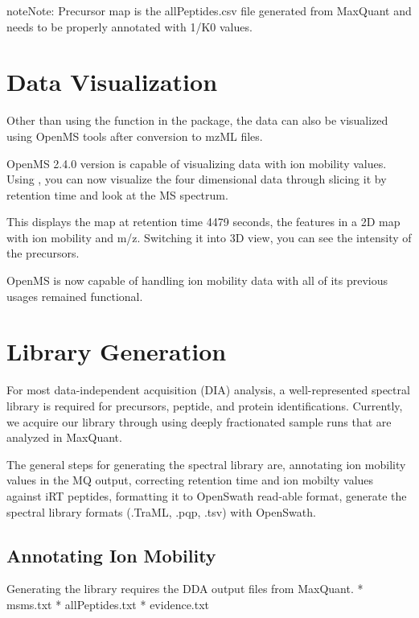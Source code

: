 \documentclass[letterpaper,10pt,english]{sphinxmanual}
\begin{document}
\begin{sphinxadmonition}{note}{Note:}
Precursor map is the allPeptides.csv file generated from MaxQuant and needs to be
properly annotated with 1/K0 values.
\end{sphinxadmonition}


\chapter{Data Visualization}
\label{\detokenize{datavisualization:data-visualization}}\label{\detokenize{datavisualization::doc}}
Other than using the  function in the package, the
data can also be visualized using OpenMS tools after conversion to mzML files.

OpenMS 2.4.0 version is capable of visualizing data with ion mobility values.
Using , you can now visualize the four dimensional data through
slicing it by retention time and look at the MS spectrum.

\noindent{}

This displays the map at retention time 4479 seconds, the features in a 2D map
with ion mobility and m/z. Switching it into 3D view, you can see the intensity
of the precursors.

\noindent{}

OpenMS is now capable of handling ion mobility data with all of its previous
usages remained functional.


\chapter{Library Generation}
\label{\detokenize{librarygeneration:library-generation}}\label{\detokenize{librarygeneration::doc}}
For most data-independent acquisition (DIA) analysis, a well-represented
spectral library is required for precursors, peptide, and protein
identifications. Currently, we acquire our library through using deeply
fractionated sample runs that are analyzed in MaxQuant.

The general steps for generating the spectral library are, annotating ion
mobility values in the MQ output, correcting retention time and ion mobilty
values against iRT peptides, formatting it to OpenSwath read-able format,
generate the spectral library formats (.TraML, .pqp, .tsv) with OpenSwath.


\section{Annotating Ion Mobility}
\label{\detokenize{librarygeneration:annotating-ion-mobility}}
Generating the library requires the DDA output files from MaxQuant.
* msms.txt
* allPeptides.txt
* evidence.txt
\end{document}
